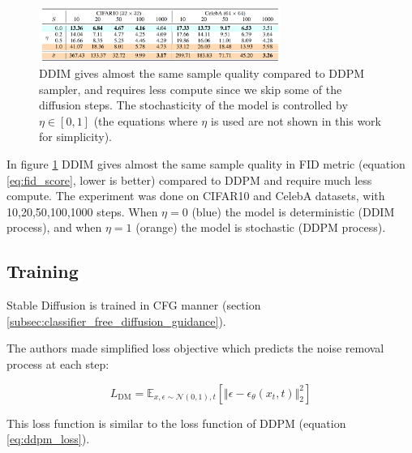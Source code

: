 \begin{figure}
    \centering
    \includegraphics[width=0.7\textwidth]{images/diffusion_models/stable_diffusion/ddim_sample_quality.png}
    \caption{DDIM gives almost the same sample quality compared to DDPM sampler, and requires less compute since we skip some of the diffusion steps. The stochasticity of the model is controlled by $\eta \in [0, 1]$ \cite{ddim} (the equations where $\eta$ is used are not shown in this work for simplicity).}
    \label{fig:ddim_sample_quality}
\end{figure}

In figure \ref{fig:ddim_sample_quality} DDIM gives almost the same sample quality in FID metric (equation \ref{eq:fid_score}, lower is better) compared to DDPM and require much less compute. The experiment was done on CIFAR10 and CelebA datasets, with 10,20,50,100,1000 steps. When $\eta = 0$ (blue) the model is deterministic (DDIM process), and when $\eta = 1$ (orange) the model is stochastic (DDPM process).















\subsection{Training}

Stable Diffusion is trained in CFG manner (section \ref{subsec:classifier_free_diffusion_guidance}).

The authors made simplified loss objective which predicts the noise removal process at each step:

\[
    L_{\text{DM}} = \mathbb{E}_{x, \epsilon \sim \mathcal{N} (0, 1), t} \left[ \Vert \epsilon - \epsilon_\theta(x_t, t) \Vert _2^2 \right]
\]

This loss function is similar to the loss function of DDPM (equation \ref{eq:ddpm_loss}).














